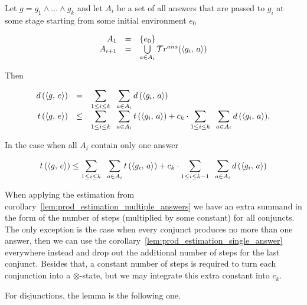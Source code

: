 \begin{lemma}
\label{lem:conjunction_metrics_calc}

Let $g = g_1 \land \dots \land g_k$ and let $A_i$ be a set of all answers that are passed to $g_i$ at some stage starting from some initial environment $e_0$

\[
\begin{array}{rcl}
A_1 &=& \{ e_0 \} \\
A_{i + 1} & = & \bigcup\limits_{a \in A_i} \mathcal{T}r^{ans}(\langle g_i ,\, a \rangle) 
\end{array}
\]

Then

\[
\begin{array}{rcl}
d\,(\langle g ,\, e \rangle) &=& \displaystyle\sum\limits_{1 \le i \le k} \;\; \displaystyle\sum\limits_{a \in A_i} d\,(\langle g_i ,\, a \rangle) \\
t\,(\langle g ,\, e \rangle) &\le& \displaystyle\sum\limits_{1 \le i \le k} \;\; \displaystyle\sum\limits_{a \in A_i} t\,(\langle g_i ,\, a \rangle) + c_k \cdot \displaystyle\sum\limits_{1 \le i \le k} \;\; \displaystyle\sum\limits_{a \in A_i} d\,(\langle g_i ,\, a \rangle), \\
\end{array}
\]

In the case when all $A_i$ contain only one answer

\[
t\,(\langle g ,\, e \rangle) \le \displaystyle\sum\limits_{1 \le i \le k} \;\; \displaystyle\sum\limits_{a \in A_i} t\,(\langle g_i ,\, a \rangle) + c_k \cdot \displaystyle \sum\limits_{1 \le i \le k - 1} \;\; \displaystyle\sum\limits_{a \in A_i} d\,(\langle g_i ,\, a \rangle)
\]

\end{lemma}

When applying the estimation from corollary~\ref{lem:prod_estimation_multiple_answers} we have an extra summand in the form of the number of steps (multiplied by some constant) for all conjuncts.
The only exception is the case when every conjunct produces no more than one answer, then we can use the corollary~\ref{lem:prod_estimation_single_answer} everywhere instead and drop out the
additional number of steps for the last conjunct. Besides that, a constant number of steps is required to turn each conjunction into a $\otimes$-state, but we may integrate this extra constant into $c_k$.

For disjunctions, the lemma is the following one.

